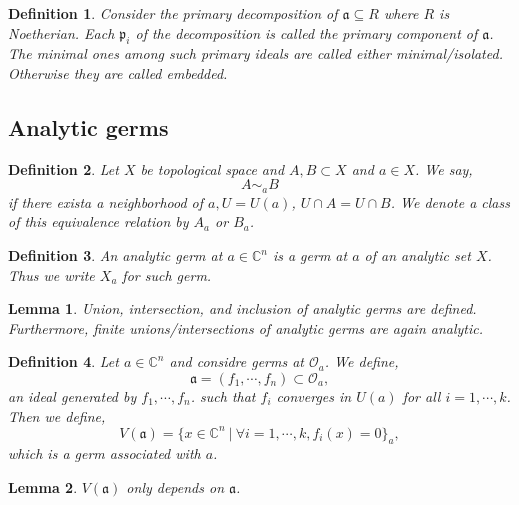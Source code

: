 \documentclass{article}
\newtheorem{definition}{Definition}[section]
\newtheorem{lemma}{Lemma}[section]
\newcommand{\C}[0]{\mathbb{C}}
\newcommand{\sep}[0]{\:|\:}
\newcommand{\Ouv}[0]{\mathcal{O}}
\begin{document}
\begin{definition}
  Consider the primary decomposition of $\mathfrak{a}\subseteq R$ where $R$ is Noetherian. Each $\mathfrak{p}_i$ of the decomposition is called the primary component of $\mathfrak{a}$. The minimal ones among such primary ideals are called either minimal/isolated. Otherwise they are called embedded.
\end{definition}

\subsection{Analytic germs}

\begin{definition}
  Let $X$ be topological space and $A,B\subset X$ and $a\in X$. We say,
  \begin{equation*}
    A\sim_aB 
  \end{equation*}
  if there exista a neighborhood of $a, U= U(a)$, $U\cap A = U\cap B$. We denote a class of this equivalence relation by $A_a$ or $B_a$. 
\end{definition}

\begin{definition}
  An analytic germ at $a\in\C^n$ is a germ at $a$ of an analytic set $X$. Thus we write $X_a$ for such germ.
\end{definition}

\begin{lemma}
  Union, intersection, and inclusion of analytic germs are defined.
  \label{lemma_6_1}
  Furthermore, finite unions/intersections of analytic germs are again analytic.
\end{lemma}

\begin{definition}
  Let $a\in\C^n$ and considre germs at $\Ouv_a$. We define,
  \begin{equation*}
    \mathfrak{a} =(f_1,\cdots,f_n)\subset\Ouv_a,
  \end{equation*}
  an ideal generated by $f_1,\cdots,f_n$. such that $f_i$ converges in $U(a)$ for all $i=1,\cdots,k$. Then we define,
  \begin{equation*}
    V(\mathfrak{a}) = \{x\in\C^n\sep \forall i=1,\cdots,k, f_i(x) = 0\}_a,
  \end{equation*}
  which is a germ associated with $a$.
\end{definition}

\begin{lemma}
  \label{lemma_6_2}
  $V(\mathfrak{a})$ only depends on $\mathfrak{a}$. 
\end{lemma}
\end{document}
